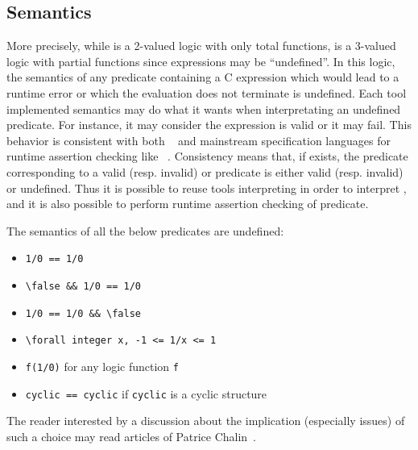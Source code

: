 
\subsection{Semantics}
\label{sec:twovaluedlogic}


More precisely, while \acsl is a 2-valued logic with only total functions,
\eacsl is a 3-valued logic with partial functions since expressions may be
``undefined''. In this logic, the semantics of any predicate containing a C
expression which would lead to a runtime error or which the evaluation does not
terminate is undefined. Each tool implemented \eacsl semantics may do what it
wants when interpretating an undefined predicate. For instance, it may consider
the expression is valid or it may fail. This behavior is consistent with both
\acsl~\cite{acsl} and mainstream specification languages for runtime assertion
checking like \jml~\cite{jml}. Consistency means that, if exists, the \eacsl
predicate corresponding to a valid (resp. invalid) \acsl or \jml predicate is
either valid (resp. invalid) or undefined. Thus it is possible to reuse tools
interpreting \acsl in order to interpret \eacsl, and it is also possible to
perform runtime assertion checking of \eacsl predicate.

\begin{example}
The semantics of all the below predicates are undefined:
\begin{itemize}
\item \lstinline|1/0 == 1/0|
\item \lstinline|\false && 1/0 == 1/0|
\item \lstinline|1/0 == 1/0 && \false|
\item \lstinline|\forall integer x, -1 <= 1/x <= 1|
\item \lstinline|f(1/0)| for any logic function \lstinline|f|
\item \lstinline|cyclic == cyclic| if \lstinline|cyclic| is a cyclic \C
  structure
\end{itemize}
\end{example}

The reader interested by a discussion about the implication (especially issues)
of such a choice may read articles of Patrice Chalin~\cite{chalin05,chalin07}.


